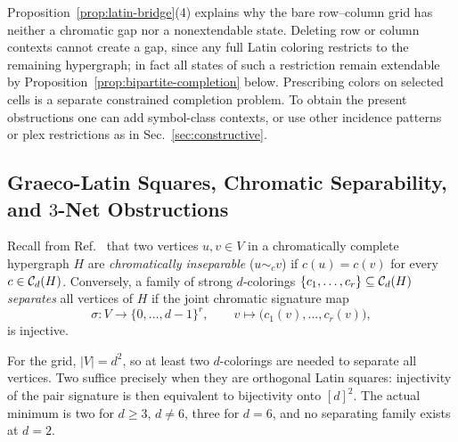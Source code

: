 \documentclass[aps,pra,reprint,superscriptaddress,longbibliography,nofootinbib,floatfix,10pt]{revtex4-2}
\theoremstyle{definition}\newtheorem{definition}[theorem]{Definition}
\theoremstyle{remark}\newtheorem{remark}[theorem]{Remark}
\begin{document}
Proposition~\ref{prop:latin-bridge}(4) explains why the bare row--column grid has neither a chromatic gap nor a nonextendable state. Deleting row or column contexts cannot create a gap, since any full Latin coloring restricts to the remaining hypergraph; in fact all states of such a restriction remain extendable by Proposition~\ref{prop:bipartite-completion} below. Prescribing colors on selected cells is a separate constrained completion problem. To obtain the present obstructions one can add symbol-class contexts, or use other incidence patterns or plex restrictions as in Sec.~\ref{sec:constructive}.

\subsection{Graeco-Latin Squares, Chromatic Separability, and \texorpdfstring{$3$}{3}-Net Obstructions}\label{sec:graeco-latin}

Recall from Ref.~\cite{svozil2026contexts} that two vertices $u,v\in V$ in a chromatically complete hypergraph $H$ are \emph{chromatically inseparable} ($u\sim_c v$) if $c(u)=c(v)$ for every $c\in\mathcal C_d(H)$. Conversely, a family of strong $d$-colorings $\{c_1,\ldots,c_r\}\subseteq\mathcal C_d(H)$ \emph{separates} all vertices of $H$ if the joint chromatic signature map
\begin{equation}\label{eq:signature-map}
\sigma:V\to\{0,\ldots,d-1\}^r,\qquad v\mapsto\bigl(c_1(v),\ldots,c_r(v)\bigr),
\end{equation}
is injective.

For the grid, $|V|=d^2$, so at least two $d$-colorings are needed to separate all vertices. Two suffice precisely when they are orthogonal Latin squares: injectivity of the pair signature is then equivalent to bijectivity onto $[d]^2$. The actual minimum is two for $d\ge3$, $d\ne6$, three for $d=6$, and no separating family exists at $d=2$.
\end{document}
